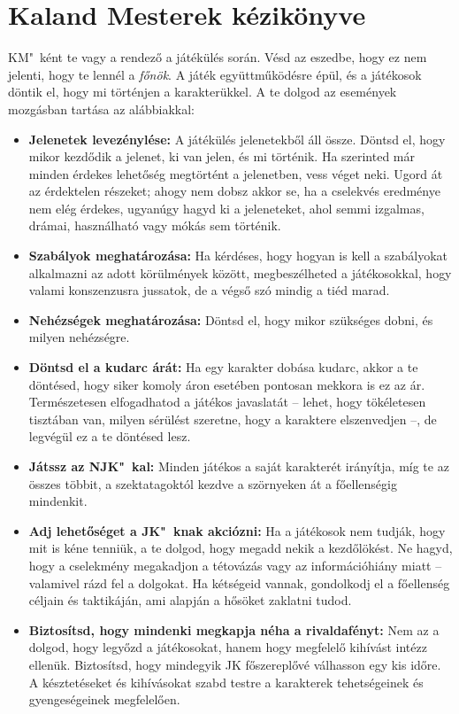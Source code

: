 \chapter{Kaland Mesterek kézikönyve}

KM"~ként te vagy a rendező a játékülés során. Vésd az eszedbe, hogy ez nem jelenti, hogy te lennél a \emph{főnök}. A  játék együttműködésre épül, és a játékosok döntik el, hogy mi történjen a karakterükkel. A te dolgod az események mozgásban tartása az alábbiakkal:

\begin{itemize}
    \item \textbf{Jelenetek levezénylése:} A játékülés jelenetekből áll össze. Döntsd el, hogy mikor kezdődik a jelenet, ki van jelen, és mi történik. Ha szerinted már minden érdekes lehetőség megtörtént a jelenetben, vess véget neki. Ugord át az érdektelen részeket; ahogy nem dobsz akkor se, ha a cselekvés eredménye nem elég érdekes, ugyanúgy hagyd ki a jeleneteket, ahol semmi izgalmas, drámai, használható vagy mókás sem történik.
    \item \textbf{Szabályok meghatározása:} Ha kérdéses, hogy hogyan is kell a szabályokat alkalmazni az adott körülmények között, megbeszélheted a játékosokkal, hogy valami konszenzusra jussatok, de a végső szó mindig a tiéd marad.
    \item \textbf{Nehézségek meghatározása:} Döntsd el, hogy mikor szükséges dobni, és milyen nehézségre.
    \item \textbf{Döntsd el a kudarc árát:} Ha egy karakter dobása kudarc, akkor a te döntésed, hogy siker komoly áron esetében pontosan mekkora is ez az ár. Természetesen elfogadhatod a játékos javaslatát -- lehet, hogy tökéletesen tisztában van, milyen sérülést szeretne, hogy a karaktere elszenvedjen --, de legvégül ez a te döntésed lesz.
    \item \textbf{Játssz az NJK"~kal:} Minden játékos a saját karakterét irányítja, míg te az összes többit, a szektatagoktól kezdve a szörnyeken át a főellenségig mindenkit.
    \item \textbf{Adj lehetőséget a JK"~knak akciózni:} Ha a játékosok nem tudják, hogy mit is kéne tenniük, a te dolgod, hogy megadd nekik a kezdőlökést. Ne hagyd, hogy a cselekmény megakadjon a tétovázás vagy az információhiány miatt -- valamivel rázd fel a dolgokat. Ha kétségeid vannak, gondolkodj el a főellenség  céljain és taktikáján, ami alapján a hősöket zaklatni tudod.
    \item \textbf{Biztosítsd, hogy mindenki megkapja néha a rivaldafényt:} Nem az a dolgod, hogy legyőzd a játékosokat, hanem hogy megfelelő kihívást intézz ellenük. Biztosítsd, hogy mindegyik JK főszereplővé válhasson egy kis időre. A késztetéseket és kihívásokat szabd testre a karakterek tehetségeinek és gyengeségeinek megfelelően.

\end{itemize}
